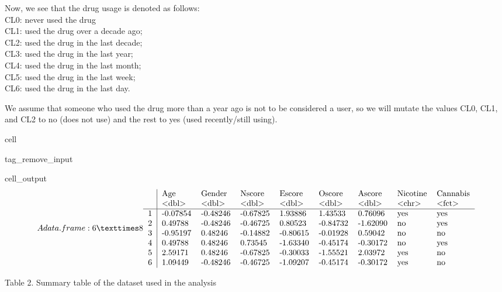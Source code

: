 \documentclass[letterpaper,10pt,english]{jupyterBook}
\begin{document}
\sphinxAtStartPar
Now, we see that the drug usage is denoted as follows:\\
CL0: never used the drug\\
CL1: used the drug over a decade ago;\\
CL2: used the drug in the last decade;\\
CL3: used the drug in the last year;\\
CL4: used the drug in the last month;\\
CL5: used the drug in the last week;\\
CL6: used the drug in the last day.

\sphinxAtStartPar
We assume that someone who used the drug more than a year ago is not to be considered a user, so we will mutate the values CL0, CL1, and CL2 to no (does not use) and the rest to yes (used recently/still using).

\begin{sphinxuseclass}{cell}
\begin{sphinxuseclass}{tag_remove_input}\begin{sphinxVerbatimOutput}

\begin{sphinxuseclass}{cell_output}\begin{equation*}
\begin{split}A data.frame: 6 × 8
\begin{tabular}{r|llllllll}
  & Age & Gender & Nscore & Escore & Oscore & Ascore & Nicotine & Cannabis\\
  & <dbl> & <dbl> & <dbl> & <dbl> & <dbl> & <dbl> & <chr> & <fct>\\
\hline
	1 & -0.07854 & -0.48246 & -0.67825 &  1.93886 &  1.43533 &  0.76096 & yes & yes\\
	2 &  0.49788 & -0.48246 & -0.46725 &  0.80523 & -0.84732 & -1.62090 & no  & yes\\
	3 & -0.95197 &  0.48246 & -0.14882 & -0.80615 & -0.01928 &  0.59042 & no  & no \\
	4 &  0.49788 &  0.48246 &  0.73545 & -1.63340 & -0.45174 & -0.30172 & no  & yes\\
	5 &  2.59171 &  0.48246 & -0.67825 & -0.30033 & -1.55521 &  2.03972 & yes & no \\
	6 &  1.09449 & -0.48246 & -0.46725 & -1.09207 & -0.45174 & -0.30172 & yes & no \\
\end{tabular}\end{split}
\end{equation*}
\end{sphinxuseclass}\end{sphinxVerbatimOutput}

\end{sphinxuseclass}
\end{sphinxuseclass}
\sphinxAtStartPar
Table 2. Summary table of the dataset used in the analysis
\end{document}
